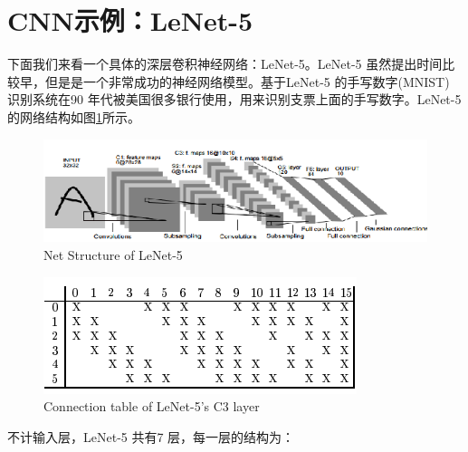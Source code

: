 \documentclass[11pt,fleqn, UTF8]{ctexbook} %
\begin{document}
\section{CNN示例：LeNet-5}
下面我们来看一个具体的深层卷积神经网络：LeNet-5\cite{lecun1998gradient}。LeNet-5 虽然提出时间比较早，但是是一个非常成功的神经网络模型。基于LeNet-5 的手写数字(MNIST) 识别系统在90 年代被美国很多银行使用，用来识别支票上面的手写数字。LeNet-5 的网络结构如图\ref{fig:6.4}所示。
\begin{figure}[t]
 \centering
 \includegraphics{pics/64.png}
 \caption{Net Structure of LeNet-5}
 \label{fig:6.4}
\end{figure}
\begin{figure}[t]
 \centering
 \includegraphics{pics/65.png}
 \caption{Connection table of LeNet-5's C3 layer}
 \label{fig:6.5}
\end{figure}
不计输入层，LeNet-5 共有7 层，每一层的结构为：
\end{document}
